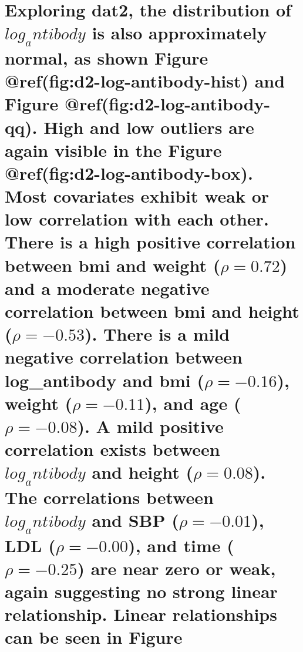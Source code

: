 \documentclass[
]{article}
\begin{document}
\section{\texorpdfstring{Exploring \textbf{dat2}, the distribution of
\textbf{$log_antibody$} is also approximately normal, as shown Figure
@ref(fig:d2-log-antibody-hist) and Figure @ref(fig:d2-log-antibody-qq).
High and low outliers are again visible in the Figure
@ref(fig:d2-log-antibody-box). Most covariates exhibit weak or low
correlation with each other. There is a high positive correlation
between \textbf{bmi} and \textbf{weight} (\(\rho = 0.72\)) and a
moderate negative correlation between \textbf{bmi} and \textbf{height}
(\(\rho = -0.53\)). There is a mild negative correlation between
\textbf{log_antibody} and \textbf{bmi} (\(\rho = -0.16\)),
\textbf{weight} (\(\rho = -0.11\)), and \textbf{age} (\(\rho = -0.08\)).
A mild positive correlation exists between \textbf{$log_antibody$} and
\textbf{height} (\(\rho = 0.08\)). The correlations between
\textbf{$log_antibody$} and \textbf{SBP} (\(\rho = -0.01\)),
\textbf{LDL} (\(\rho = -0.00\)), and \textbf{time} (\(\rho = -0.25\))
are near zero or weak, again suggesting no strong linear relationship.
Linear relationships can be seen in
Figure}{Exploring , the distribution of  is also approximately normal, as shown Figure @ref(fig:d2-log-antibody-hist) and Figure @ref(fig:d2-log-antibody-qq). High and low outliers are again visible in the Figure @ref(fig:d2-log-antibody-box). Most covariates exhibit weak or low correlation with each other. There is a high positive correlation between  and  (\textbackslash rho = 0.72) and a moderate negative correlation between  and  (\textbackslash rho = -0.53). There is a mild negative correlation between  and  (\textbackslash rho = -0.16),  (\textbackslash rho = -0.11), and  (\textbackslash rho = -0.08). A mild positive correlation exists between  and  (\textbackslash rho = 0.08). The correlations between  and  (\textbackslash rho = -0.01),  (\textbackslash rho = -0.00), and  (\textbackslash rho = -0.25) are near zero or weak, again suggesting no strong linear relationship. Linear relationships can be seen in Figure}}\label{exploring-the-distribution-of-is-also-approximately-normal-as-shown-figure-reffigd2-log-antibody-hist-and-figure-reffigd2-log-antibody-qq.-high-and-low-outliers-are-again-visible-in-the-figure-reffigd2-log-antibody-box.-most-covariates-exhibit-weak-or-low-correlation-with-each-other.-there-is-a-high-positive-correlation-between-and-rho-0.72-and-a-moderate-negative-correlation-between-and-rho--0.53.-there-is-a-mild-negative-correlation-between-and-rho--0.16-rho--0.11-and-rho--0.08.-a-mild-positive-correlation-exists-between-and-rho-0.08.-the-correlations-between-and-rho--0.01-rho--0.00-and-rho--0.25-are-near-zero-or-weak-again-suggesting-no-strong-linear-relationship.-linear-relationships-can-be-seen-in-figure}
\end{document}
